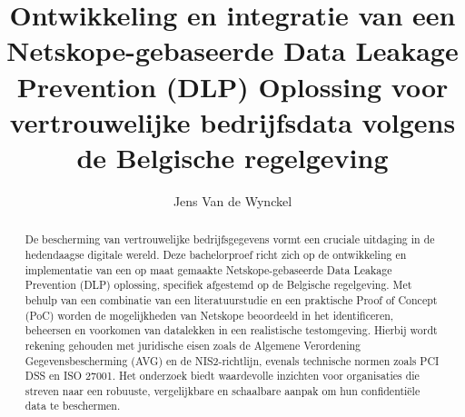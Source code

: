 \documentclass{hogent-article}
\title{Ontwikkeling en integratie van een Netskope-gebaseerde Data Leakage Prevention (DLP) Oplossing voor vertrouwelijke bedrijfsdata volgens de Belgische regelgeving}
\author{Jens Van de Wynckel}
\begin{document}
\begin{abstract}
  De bescherming van vertrouwelijke bedrijfsgegevens vormt een cruciale uitdaging in de hedendaagse digitale wereld. Deze bachelorproef richt zich op de ontwikkeling en implementatie van een op maat gemaakte Netskope-gebaseerde Data Leakage Prevention (DLP) oplossing, specifiek afgestemd op de Belgische regelgeving. Met behulp van een combinatie van een literatuurstudie en een praktische Proof of Concept (PoC) worden de mogelijkheden van Netskope beoordeeld in het identificeren, beheersen en voorkomen van datalekken in een realistische testomgeving. Hierbij wordt rekening gehouden met juridische eisen zoals de Algemene Verordening Gegevensbescherming (AVG) en de NIS2-richtlijn, evenals technische normen zoals PCI DSS en ISO 27001. Het onderzoek biedt waardevolle inzichten voor organisaties die streven naar een robuuste, vergelijkbare en schaalbare aanpak om hun confidentiële data te beschermen.
\end{abstract}

\tableofcontents



\printbibliography[heading=bibintoc]
\end{document}
